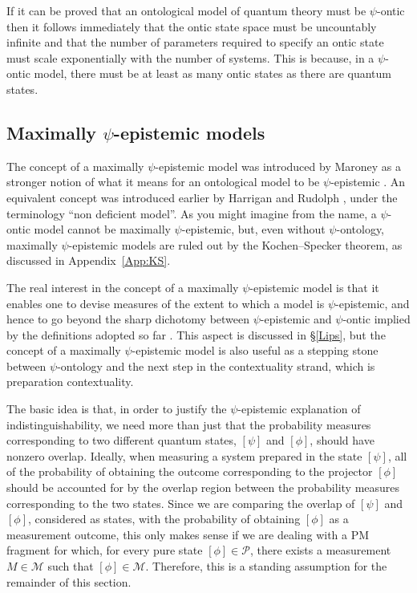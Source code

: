 \documentclass[DIV=calc,paper=a4,fontsize=11pt,twocolumn]{scrartcl} %
\theoremstyle{definition}
\theoremstyle{plain}
\newcommand{\Proj}[1]{\ensuremath{\left [ #1 \right ]}}
\begin{document}
If it can be proved that an ontological model of quantum theory must
be $\psi$-ontic then it follows immediately that the ontic state space
must be uncountably infinite and that the number of parameters
required to specify an ontic state must scale exponentially with the
number of systems.  This is because, in a $\psi$-ontic model, there
must be at least as many ontic states as there are quantum states.

\subsection{Maximally $\psi$-epistemic models}

\label{ME}

The concept of a maximally $\psi$-epistemic model was introduced by
Maroney as a stronger notion of what it means for an ontological model
to be $\psi$-epistemic \cite{Maroney2012}.  An equivalent concept was
introduced earlier by Harrigan and Rudolph \cite{Harrigan2007}, under
the terminology ``non deficient model''.  As you might imagine from
the name, a $\psi$-ontic model cannot be maximally $\psi$-epistemic,
but, even without $\psi$-ontology, maximally $\psi$-epistemic models
are ruled out by the Kochen--Specker theorem, as discussed in
Appendix~\ref{App:KS}.

The real interest in the concept of a maximally $\psi$-epistemic model
is that it enables one to devise measures of the extent to which a
model is $\psi$-epistemic, and hence to go beyond the sharp dichotomy
between $\psi$-epistemic and $\psi$-ontic implied by the definitions
adopted so far \cite{Maroney2012, Barrett2013, Leifer2014,
Branciard2014}.  This aspect is discussed in \S\ref{Lips}, but the
concept of a maximally $\psi$-epistemic model is also useful as a
stepping stone between $\psi$-ontology and the next step in the
contextuality strand, which is preparation contextuality.

The basic idea is that, in order to justify the $\psi$-epistemic
explanation of indistinguishability, we need more than just that the
probability measures corresponding to two different quantum states,
$\Proj{\psi}$ and $\Proj{\phi}$, should have nonzero overlap.
Ideally, when measuring a system prepared in the state $\Proj{\psi}$,
all of the probability of obtaining the outcome corresponding to the
projector $\Proj{\phi}$ should be accounted for by the overlap region
between the probability measures corresponding to the two states.
Since we are comparing the overlap of $\Proj{\psi}$ and $\Proj{\phi}$,
considered as states, with the probability of obtaining $\Proj{\phi}$
as a measurement outcome, this only makes sense if we are dealing with
a PM fragment for which, for every pure state $\Proj{\phi} \in
\mathcal{P}$, there exists a measurement $M \in \mathcal{M}$ such that
$\Proj{\phi} \in \mathcal{M}$.  Therefore, this is a standing
assumption for the remainder of this section.
\end{document}

